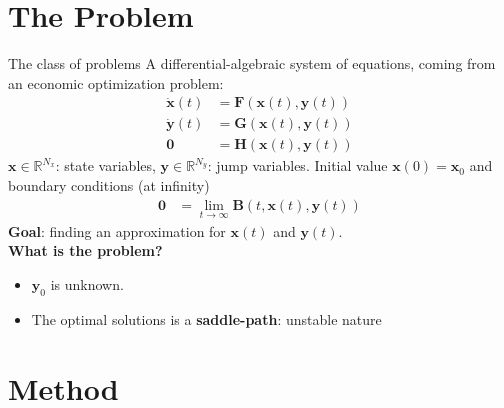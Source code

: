 \documentclass[aspectratio=169,10pt]{beamer}
\newcommand{\emphcolor}[1]{\textbf{\textcolor{emphcolorval}{#1}}}
\begin{document}
\section{The Problem}

\begin{frame}{The class of problems}
A differential-algebraic system of equations, coming from an economic optimization problem:	
	\begin{align}
		\dot{\mathbf{x}}(t) &= \mathbf{F}(\mathbf{x}(t), \mathbf{y}(t))\\ %
		\dot{\mathbf{y}}(t) &= \mathbf{G}(\mathbf{x}(t), \mathbf{y}(t))\\
		\mathbf{0} &= \mathbf{H}(\mathbf{x}(t), \mathbf{y}(t))
	\end{align}
$\mathbf{x}\in \mathbb{R}^{N_x}$: state variables, $\mathbf{y}\in\mathbb{R}^{N_y}$: jump variables.
Initial value $\mathbf{x}(0) = \mathbf{x}_0$ and boundary conditions (at infinity)
	\begin{align}
		\mathbf{0} &= \lim_{t\rightarrow\infty} \mathbf{B}(t,\mathbf{x}(t), \mathbf{y}(t))
	\end{align}
\emphcolor{Goal}: finding an approximation for $\mathbf{x}(t)$ and $\mathbf{y}(t)$.\\
	\vspace{0.1in}
\emphcolor{What is the problem?} 
\begin{itemize}
	\item $\mathbf{y}_0$ is unknown. 
	\vspace{0.1in}
	\item The optimal solutions is a \emphcolor{saddle-path}: unstable nature
	\vspace{0.1in}
\end{itemize}
\end{frame}

\section{Method}
\end{document}
